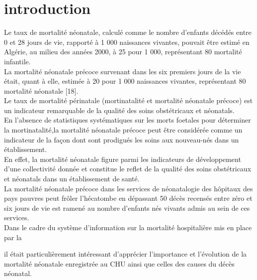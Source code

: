 \section{introduction}
Le taux de mortalité néonatale, calculé comme le nombre
d’enfants décédés entre 0 et 28 jours de vie, rapporté à 1 000
naissances vivantes, pouvait être estimé en Algérie, au milieu
des années 2000, à 25 pour 1 000, représentant 80 %
mortalité infantile.\\ 

La mortalité néonatale précoce survenant
dans les six premiers jours de la vie était, quant à elle, estimée
à 20 pour 1 000 naissances vivantes, représentant 80 %
mortalité néonatale [18].\\

Le taux de mortalité périnatale (mortinatalité et mortalité
néonatale précoce) est un indicateur remarquable de la
qualité des soins obstétricaux et néonatals.\\

En l’absence de statistiques systématiques sur les morts foetales pour déterminer la mortinatalité,la mortalité néonatale
précoce peut être considérée comme un indicateur de la façon dont
sont prodigués les soins aux nouveau-nés dans un établissement.\\

En effet, la mortalité néonatale figure parmi les
indicateurs de développement d’une collectivité donnée
et constitue le reflet de la qualité des soins obstétricaux et
néonatals dans un établissement de santé.\\

La mortalité néonatale précoce dans les services de
néonatalogie des hôpitaux des pays pauvres peut frôler
l’hécatombe en dépassant 50 %
décès recensés entre zéro et six jours de vie est ramené au
nombre d’enfants nés vivants admis au sein de ces services.\\

Dans le cadre du système d’information sur la mortalité
hospitalière mis en place par la \dsp \ 

il était particulièrement intéressant d’apprécier l’importance et l’évolution de la mortalité néonatale enregistrée au CHU ainsi que celles des causes du décès néonatal.